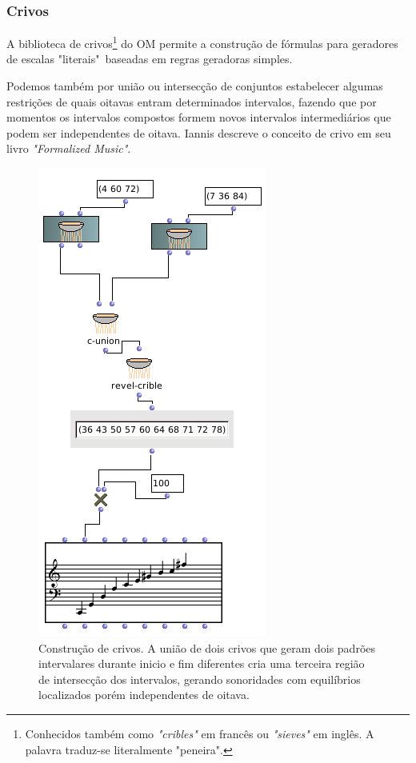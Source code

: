 \documentclass[
	12pt,				%
	openright,			%
	twoside,			%
	a4paper,			%
	english,			%
	french,				%
	spanish,			%
	brazil				%
	]{abntex2}
\begin{document}
\subsubsection{Crivos}

A biblioteca de crivos\footnote{Conhecidos também como \textit{"cribles"} em francês ou \textit{"sieves"} em inglês. A palavra traduz-se literalmente "peneira".} do OM permite a construção de fórmulas para geradores de escalas "literais"\ baseadas em regras geradoras simples.

Podemos também por união ou intersecção de conjuntos estabelecer algumas restrições de quais oitavas entram determinados intervalos, fazendo que por momentos os intervalos compostos formem novos intervalos intermediários que podem ser independentes de oitava. Iannis  descreve o conceito de crivo em seu livro \textit{"Formalized Music"}.
 
\begin{figure}[!h]
	\caption{\label{fig_grafico}Construção de crivos. A união de dois crivos que geram dois padrões intervalares durante inicio e fim diferentes cria uma terceira região de intersecção dos intervalos, gerando sonoridades com equilíbrios localizados porém independentes de oitava. }
	\begin{center}
	    \includegraphics[scale=0.6]{OM_settheory/crivos.png}
	\end{center}
\end{figure}
\end{document}
